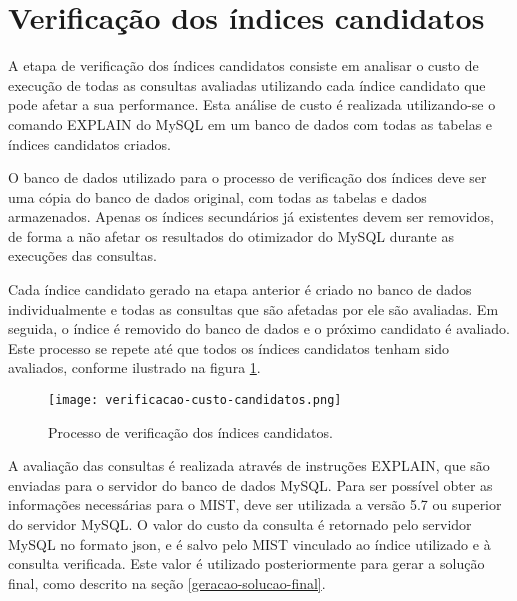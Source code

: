 \section{Verificação dos índices candidatos}
\label{verificacao-custo-indices-candidatos}

A etapa de verificação dos índices candidatos consiste em analisar o custo de execução de todas as consultas avaliadas utilizando cada índice candidato que pode afetar a sua performance. Esta análise de custo é realizada utilizando-se o comando EXPLAIN do MySQL em um banco de dados com todas as tabelas e índices candidatos criados.

O banco de dados utilizado para o processo de verificação dos índices deve ser uma cópia do banco de dados original, com todas as tabelas e dados armazenados. Apenas os índices secundários já existentes devem ser removidos, de forma a não afetar os resultados do otimizador do MySQL durante as execuções das consultas.

Cada índice candidato gerado na etapa anterior é criado no banco de dados individualmente e todas as consultas que são afetadas por ele são avaliadas. Em seguida, o índice é removido do banco de dados e o próximo candidato é avaliado. Este processo se repete até que todos os índices candidatos tenham sido avaliados, conforme ilustrado na figura \ref{fig:verificacao-custo-candidatos}.

\begin{figure}[!hbt]
  \centering
  \caption{Processo de verificação dos índices candidatos.}
  \texttt{[image: verificacao-custo-candidatos.png]}
  \label{fig:verificacao-custo-candidatos}
\end{figure}

A avaliação das consultas é realizada através de instruções EXPLAIN, que são enviadas para o servidor do banco de dados MySQL. Para ser possível obter as informações necessárias para o MIST, deve ser utilizada a versão 5.7 ou superior do servidor MySQL. O valor do custo da consulta é retornado pelo servidor MySQL no formato \gls{json}, e é salvo pelo MIST vinculado ao índice utilizado e à consulta verificada. Este valor é utilizado posteriormente para gerar a solução final, como descrito na seção \ref{geracao-solucao-final}.

